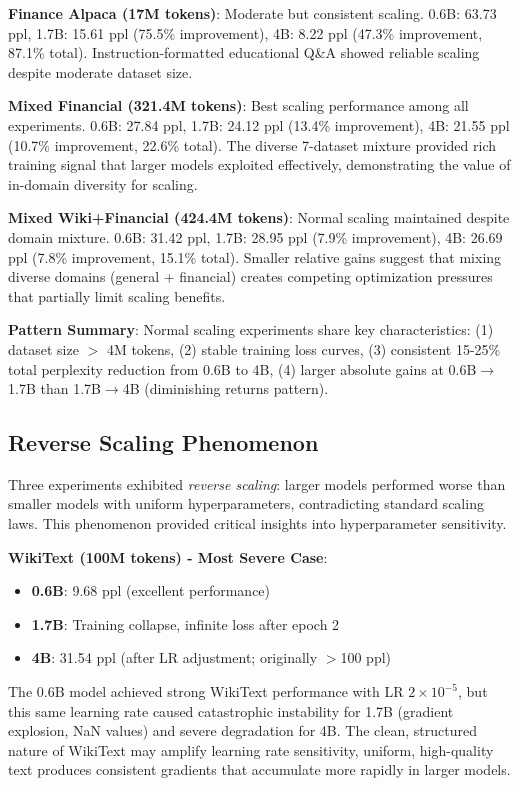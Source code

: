 \textbf{Finance Alpaca (17M tokens)}: Moderate but consistent scaling. 0.6B: 63.73 ppl, 1.7B: 15.61 ppl (75.5\% improvement), 4B: 8.22 ppl (47.3\% improvement, 87.1\% total). Instruction-formatted educational Q\&A showed reliable scaling despite moderate dataset size.

\textbf{Mixed Financial (321.4M tokens)}: Best scaling performance among all experiments. 0.6B: 27.84 ppl, 1.7B: 24.12 ppl (13.4\% improvement), 4B: 21.55 ppl (10.7\% improvement, 22.6\% total). The diverse 7-dataset mixture provided rich training signal that larger models exploited effectively, demonstrating the value of in-domain diversity for scaling.

\textbf{Mixed Wiki+Financial (424.4M tokens)}: Normal scaling maintained despite domain mixture. 0.6B: 31.42 ppl, 1.7B: 28.95 ppl (7.9\% improvement), 4B: 26.69 ppl (7.8\% improvement, 15.1\% total). Smaller relative gains suggest that mixing diverse domains (general + financial) creates competing optimization pressures that partially limit scaling benefits.

\textbf{Pattern Summary}: Normal scaling experiments share key characteristics: (1) dataset size $>$ 4M tokens, (2) stable training loss curves, (3) consistent 15-25\% total perplexity reduction from 0.6B to 4B, (4) larger absolute gains at 0.6B$\to$1.7B than 1.7B$\to$4B (diminishing returns pattern).

\subsection{Reverse Scaling Phenomenon}

Three experiments exhibited \textit{reverse scaling}: larger models performed worse than smaller models with uniform hyperparameters, contradicting standard scaling laws. This phenomenon provided critical insights into hyperparameter sensitivity.

\textbf{WikiText (100M tokens) - Most Severe Case}:
\begin{itemize}
\item \textbf{0.6B}: 9.68 ppl (excellent performance)
\item \textbf{1.7B}: Training collapse, infinite loss after epoch 2
\item \textbf{4B}: 31.54 ppl (after LR adjustment; originally $>$100 ppl)
\end{itemize}

The 0.6B model achieved strong WikiText performance with LR $2 \times 10^{-5}$, but this same learning rate caused catastrophic instability for 1.7B (gradient explosion, NaN values) and severe degradation for 4B. The clean, structured nature of WikiText may amplify learning rate sensitivity, uniform, high-quality text produces consistent gradients that accumulate more rapidly in larger models.

